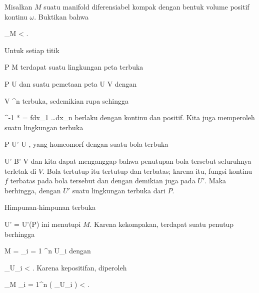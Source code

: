 {

Misalkan $M$ suatu manifold diferensiabel kompak dengan bentuk volume positif kontinu $\omega$. Buktikan bahwa

\mavergleichskettedisp
{\vergleichskette
{ \int_M \omega
}
{ <} { \infty
}
{ } {
}
{ } {
}
{ } {
}
}
{}{}{}.

}
{

Untuk setiap titik

\mavergleichskette
{\vergleichskette
{ P
}
{ \in }{ M
}
{  }{
}
{    }{
}
{   }{
}
}
{}{}{}
terdapat suatu lingkungan peta terbuka

\mavergleichskette
{\vergleichskette
{ P
}
{ \in }{ U
}
{  }{
}
{    }{
}
{   }{
}
}
{}{}{}
dan suatu pemetaan peta
\maabbdisp {\alpha} { U } { V
} {}
dengan

\mavergleichskette
{\vergleichskette
{ V
}
{ \subseteq }{ \R^n
}
{  }{
}
{    }{
}
{   }{
}
}
{}{}{}
terbuka, sedemikian rupa sehingga

\mavergleichskette
{\vergleichskette
{ \alpha^{-1 *} \omega
}
{ = }{ fdx_1 \wedge \ldots \wedge dx_n
}
{  }{
}
{    }{
}
{   }{
}
}
{}{}{}
berlaku dengan
 kontinu dan positif. Kita juga memperoleh suatu lingkungan terbuka

\mavergleichskette
{\vergleichskette
{ P
}
{ \in }{ U'
}
{ \subseteq }{ U
}
{    }{
}
{   }{
}
}
{}{}{,}
yang homeomorf dengan suatu bola terbuka

\mavergleichskette
{\vergleichskette
{ U'
}
{ \cong }{ B'
}
{ \subseteq }{ V
}
{    }{
}
{   }{
}
}
{}{}{}
dan kita dapat menganggap bahwa penutupan bola tersebut seluruhnya terletak di $V$. Bola tertutup itu tertutup dan terbatas; karena itu, fungsi kontinu $f$ terbatas pada bola tersebut dan dengan demikian juga pada $U'$. Maka
 berhingga, dengan $U'$ suatu lingkungan terbuka dari $P$.

Himpunan-himpunan terbuka

\mavergleichskette
{\vergleichskette
{ U'
}
{ = }{ U'(P)
}
{  }{
}
{    }{
}
{   }{
}
}
{}{}{}
ini menutupi $M$. Karena kekompakan, terdapat suatu penutup berhingga

\mavergleichskettedisp
{\vergleichskette
{ M
}
{ =} { \bigcup_{i = 1} ^n U_i
}
{ } {
}
{ } {
}
{ } {
}
}
{}{}{}
dengan

\mavergleichskettedisp
{\vergleichskette
{ \int_{U_i } \omega
}
{ <} { \infty
}
{ } {
}
{ } {
}
{ } {
}
}
{}{}{.}
Karena kepositifan, diperoleh

\mavergleichskettedisp
{\vergleichskette
{ \int_{M} \omega
}
{ \leq} { \sum_{i = 1}^n  \left(  \int_{U_i } \omega  \right)
}
{ <} { \infty
}
{ } {
}
{ } {
}
}
{}{}{.}

 }



